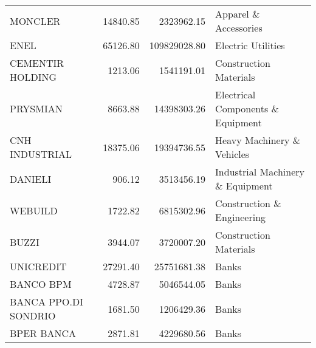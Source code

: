 \begin{tabular}{lrrl}
               MONCLER &    14840.85 &   2323962.15 &                              Apparel \& Accessories \\
                  ENEL &    65126.80 & 109829028.80 &                                 Electric Utilities \\
      CEMENTIR HOLDING &     1213.06 &   1541191.01 &                             Construction Materials \\
              PRYSMIAN &     8663.88 &  14398303.26 &                  Electrical Components \& Equipment \\
        CNH INDUSTRIAL &    18375.06 &  19394736.55 &                         Heavy Machinery \& Vehicles \\
               DANIELI &      906.12 &   3513456.19 &                   Industrial Machinery \& Equipment \\
               WEBUILD &     1722.82 &   6815302.96 &                         Construction \& Engineering \\
                 BUZZI &     3944.07 &   3720007.20 &                             Construction Materials \\
             UNICREDIT &    27291.40 &  25751681.38 &                                              Banks \\
             BANCO BPM &     4728.87 &   5046544.05 &                                              Banks \\
  BANCA PPO.DI SONDRIO &     1681.50 &   1206429.36 &                                              Banks \\
            BPER BANCA &     2871.81 &   4229680.56 &                                              Banks \\
\bottomrule
\end{tabular}
